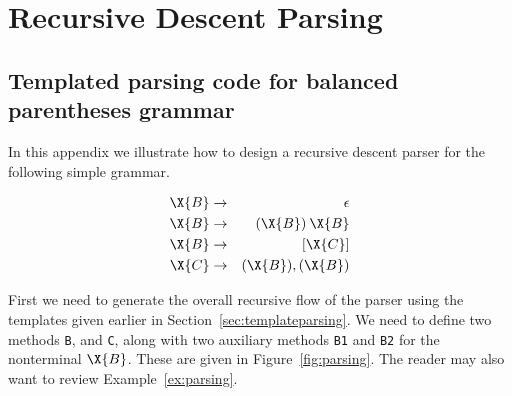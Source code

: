 \chapter{Recursive Descent Parsing}
\label{app:parsing}

\section{Templated parsing code for balanced parentheses grammar}

In this appendix we illustrate how to design a recursive descent parser 
for the following simple grammar.

\begin{eqnarray*}
  \X{B} & \rightarrow & \epsilon \\
  \X{B} & \rightarrow & ( \X{B} ) \: \X{B}\\
  \X{B} & \rightarrow & [ \X{C} ] \\
  \X{C} & \rightarrow & ( \X{B} ) , ( \X{B} )\\
\end{eqnarray*}

First we need to generate the overall recursive flow of the
parser using the templates given earlier in Section~\ref{sec:templateparsing}.
We need to define two methods \texttt{B},
and 
\texttt{C}, along with two auxiliary methods 
\texttt{B1} and
\texttt{B2} for the nonterminal $\X{B}$.  
These are given in Figure~\ref{fig:parsing}.
The reader may also want to review Example~\ref{ex:parsing}. 

